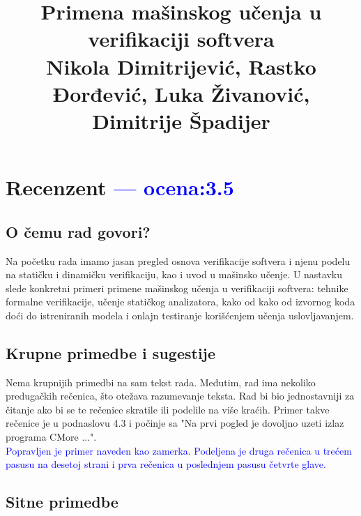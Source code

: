 \documentclass[a4paper]{report}
\newcommand{\odgovor}[1]{\textcolor{blue}{#1}}
\begin{document}
\title{Primena mašinskog učenja u verifikaciji softvera\\ \small{Nikola Dimitrijević, Rastko Đorđević, Luka Živanović, Dimitrije Špadijer}}

\maketitle

\tableofcontents

\chapter{Recenzent \odgovor{--- ocena:3.5} }


\section{O čemu rad govori?}

Na početku rada imamo jasan pregled osnova verifikacije softvera i njenu podelu na statičku i dinamičku verifikaciju, kao i uvod u mašinsko učenje. U nastavku slede konkretni primeri primene mašinskog učenja u verifikaciji softvera: tehnike formalne verifikacije, učenje statičkog analizatora, kako od kako od izvornog koda doći do istreniranih modela i onlajn testiranje korišćenjem učenja u\-slo\-vlja\-va\-njem.

\section{Krupne primedbe i sugestije}

Nema krupnijih primedbi na sam tekst rada. Međutim, rad ima nekoliko pre\-du\-ga\-čkih rečenica, što otežava razumevanje teksta. Rad bi bio jednostavniji za čitanje ako bi se te rečenice skratile ili podelile na više kraćih. Primer takve rečenice je u podnaslovu 4.3 i počinje sa "Na prvi pogled je dovoljno uzeti izlaz programa CMore ...".
\\\odgovor{ Popravljen je primer naveden kao zamerka. Podeljena je druga rečenica u trećem pasusu na desetoj strani i prva rečenica u poslednjem pasusu četvrte glave. }

\section{Sitne primedbe}
\end{document}
